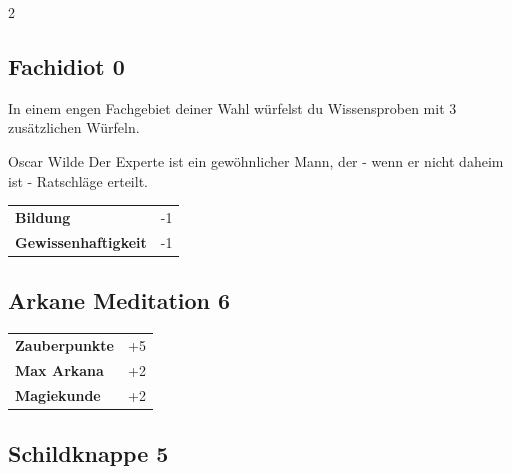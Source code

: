 \begin{multicols}{2}
\begin{tcolorbox}
    \subsection*{Fachidiot \hfill \small{0 }}
    \tcblower
In einem engen Fachgebiet deiner Wahl würfelst du Wissensproben mit 3 zusätzlichen Würfeln.

\begin{pquote}{Oscar Wilde}
Der Experte ist ein gewöhnlicher Mann, der - wenn er nicht daheim ist - Ratschläge erteilt.
\end{pquote}

\vspace{3mm}

\begin{tabular}{@{}ll@{}}
    \textbf{Bildung} & -1\\
    \textbf{Gewissenhaftigkeit} & -1\\
\end{tabular}


\end{tcolorbox}

\begin{tcolorbox}
    \subsection*{Arkane Meditation \hfill \small{6 }}
    \tcblower




\begin{tabular}{@{}ll@{}}
    \textbf{Zauberpunkte} & +5\\
    \textbf{Max Arkana} & +2\\
    \textbf{Magiekunde} & +2\\
\end{tabular}


\end{tcolorbox}

\begin{tcolorbox}
    \subsection*{Schildknappe \hfill \small{5 }}
    \tcblower



\end{tcolorbox}
\end{multicols}

